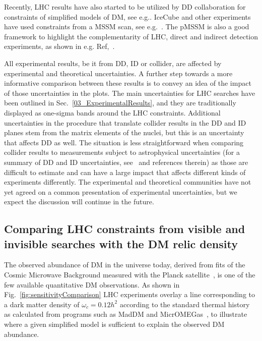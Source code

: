 Recently, LHC results have also started to be utilized by DD collaboration for constraints of simplified models of DM, see e.g.\cite{PhysRevLett.118.251301,Balazs:2017hxh}. IceCube and other experiments have used constraints from a MSSM scan, see e.g.~\cite{Aartsen:2016zhm}. The pMSSM is also a good framework to highlight the complementarity of LHC, direct and indirect detection experiments, as shown in e.g. Ref,~\cite{Cahill-Rowley:2014twa}.  %




All experimental results, be it from DD, ID or collider, are affected by experimental and theoretical uncertainties.
A further step towards a more informative comparison between these results is to convey 
an idea of the impact of those uncertainties in the plots. 
The main uncertainties for LHC searches have been outlined in Sec.~\ref{03_ExperimentalResults},
and they are traditionally displayed as one-sigma bands around the LHC constraints. 
Additional uncertainties in the procedure that translate collider results in the DD and ID planes
stem from the matrix elements of the nuclei, but this is an uncertainty that
affects DD as well. %
The situation is less straightforward when comparing collider results to measurements subject to astrophysical
uncertainties (for a summary of DD and ID uncertainties, see~\cite{Feldstein:2014ufa,d300ef23986a49099715e661295a4d72}
and references therein) as those are difficult to estimate and can have a large impact that affects 
different kinds of experiments differently. 
The experimental and theoretical communities have not yet agreed on a common presentation of experimental uncertainties, 
but we expect the discussion will continue in the future. 

\subsection{Comparing LHC constraints from visible and invisible searches with the DM relic density}

The observed abundance of DM in the universe today, derived from fits of the Cosmic Microwave Background
measured with the Planck satellite~\cite{Ade:2015xua}, is one
of the few %
available quantitative DM observations. 
As shown in Fig.~\ref{fig:sensitivityComparison} LHC experiments overlay a line corresponding to 
a dark matter density of $\omega_c = 0.12 h^2$ according to the standard thermal history as calculated
from programs such as MadDM and MicrOMEGas~\cite{Backovic:2015cra,Barducci:2016pcb}, to 
illustrate where a given simplified model is sufficient to explain the observed DM abundance. 

